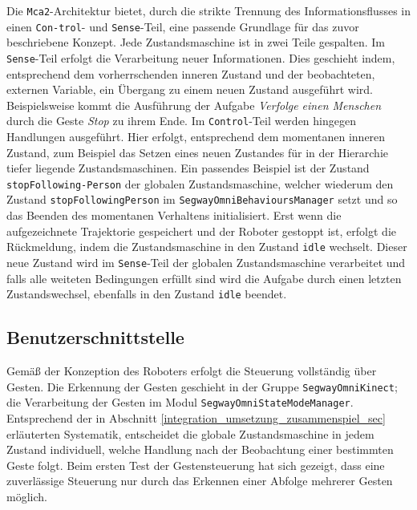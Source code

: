 Die \lstinline{Mca2}-Architektur bietet, durch die strikte Trennung des Informationsflusses in 
einen \lstinline{Con-trol}- und \lstinline{Sense}-Teil, eine passende Grundlage
für das zuvor beschriebene Konzept. Jede Zustandsmaschine ist in zwei Teile gespalten. Im \lstinline{Sense}-Teil 
erfolgt die Verarbeitung neuer Informationen. Dies geschieht indem, entsprechend dem vorherrschenden 
inneren Zustand und der beobachteten, externen Variable, ein Übergang zu einem neuen Zustand 
ausgeführt wird. Beispielsweise kommt die Ausführung der Aufgabe \textit{Verfolge einen Menschen} 
durch die Geste \textit{Stop} zu ihrem Ende. Im \lstinline{Control}-Teil werden hingegen 
Handlungen ausgeführt. Hier erfolgt, entsprechend dem momentanen inneren Zustand, zum Beispiel 
das Setzen eines neuen Zustandes für in der Hierarchie tiefer liegende Zustandsmaschinen. 
Ein passendes Beispiel ist der Zustand \lstinline{stopFollowing-Person} der
globalen Zustandsmaschine, welcher wiederum den Zustand \lstinline{stopFollowingPerson} im
\lstinline{SegwayOmniBehavioursManager} setzt und so das Beenden des momentanen Verhaltens initialisiert. Erst wenn die aufgezeichnete 
Trajektorie gespeichert und der Roboter gestoppt ist, erfolgt die Rückmeldung, indem die 
Zustandsmaschine in den Zustand \lstinline{idle} wechselt. Dieser neue Zustand wird 
im \lstinline{Sense}-Teil der globalen Zustandsmaschine verarbeitet und falls alle weiteten 
Bedingungen erfüllt sind wird die Aufgabe durch einen letzten Zustandswechsel, ebenfalls in 
den Zustand \lstinline{idle} beendet.


\subsection{Benutzerschnittstelle}
\label{benutzerschnittstelle_integration_cha}

Gemäß der Konzeption des Roboters erfolgt die Steuerung vollständig über Gesten. Die Erkennung der Gesten 
geschieht in der Gruppe \lstinline{SegwayOmniKinect}; die Verarbeitung der Gesten im Modul \lstinline{SegwayOmniStateModeManager}. Entsprechend der in Abschnitt \ref{integration_umsetzung_zusammenspiel_sec}
 erläuterten Systematik, entscheidet die globale Zustandsmaschine in jedem Zustand individuell, welche Handlung 
 nach der Beobachtung einer bestimmten Geste folgt. Beim ersten Test der Gestensteuerung hat sich gezeigt, 
 dass eine zuverlässige Steuerung nur durch das Erkennen einer Abfolge mehrerer Gesten möglich. 

